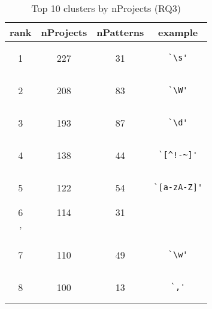
\begin{table}
\begin{center}
\caption{Top 10 clusters by nProjects (RQ3)}
\label{table:topNClusters}

\begin{tabular}
{cccc}
\toprule
rank & nProjects & nPatterns & example\\
\midrule
1 & 227 & 31 & \begin{minipage}{0.5in}\begin{verbatim}`\s'\end{verbatim}\end{minipage}\\
\midrule
2 & 208 & 83 & \begin{minipage}{0.5in}\begin{verbatim}`\W'\end{verbatim}\end{minipage}\\
\midrule
3 & 193 & 87 & \begin{minipage}{0.5in}\begin{verbatim}`\d'\end{verbatim}\end{minipage}\\
\midrule
4 & 138 & 44 & \begin{minipage}{0.5in}\begin{verbatim}`[^!-~]'\end{verbatim}\end{minipage}\\
\midrule
5 & 122 & 54 & \begin{minipage}{0.5in}\begin{verbatim}`[a-zA-Z]'\end{verbatim}\end{minipage}\\
\midrule
6 & 114 & 31 & \begin{minipage}{0.5in}\begin{verbatim}`\\'\end{verbatim}\end{minipage}\\
\midrule
7 & 110 & 49 & \begin{minipage}{0.5in}\begin{verbatim}`\w'\end{verbatim}\end{minipage}\\
\midrule
8 & 100 & 13 & \begin{minipage}{0.5in}\begin{verbatim}`,'\end{verbatim}\end{minipage}\\

\end{tabular}
\end{center}
\end{table}
